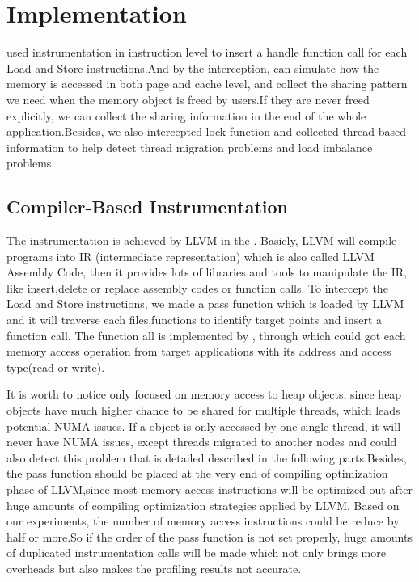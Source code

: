 \section{Implementation}
\NP{} used instrumentation in instruction level to insert a handle function call for each Load and Store instructions.And by the interception, \NP{} can simulate how the memory is accessed in both page and cache level, and collect the sharing pattern we need when the memory object is freed by users.If they are never freed explicitly, we can collect the sharing information in the end of the whole application.Besides, we also intercepted lock function and collected thread based information to help detect thread migration problems and load imbalance problems.
\subsection{Compiler-Based Instrumentation} 
The instrumentation is achieved by LLVM in the \NP{}. Basicly, LLVM will compile programs into IR (intermediate representation) which is also called LLVM Assembly Code, then it provides lots of libraries and tools to manipulate the IR, like insert,delete or replace assembly codes or function calls.
To intercept the Load and Store instructions, we made a pass function which is loaded by LLVM and it will traverse each files,functions to identify target points and insert a function call. The function all is implemented by \NP{}, through which \NP{} could got each memory access operation from target applications with its address and access type(read or write).

It is worth to notice \NP{} only focused on memory access to heap objects, since heap objects have much higher chance to be shared for multiple threads, which leads potential NUMA issues. If a object is only accessed by one single thread, it will never have NUMA issues, except threads migrated to another nodes and \NP{} could also detect this problem that is detailed described in the following parts.Besides, the pass function should be placed at the very end of compiling optimization phase of LLVM,since most memory access instructions will be optimized out after huge amounts of compiling optimization strategies applied by LLVM. Based on our experiments, the number of memory access instructions could be reduce by half or more.So if the order of the pass function is not set properly, huge amounts of duplicated instrumentation calls will be made which not only brings more overheads but also makes the profiling results not accurate.

